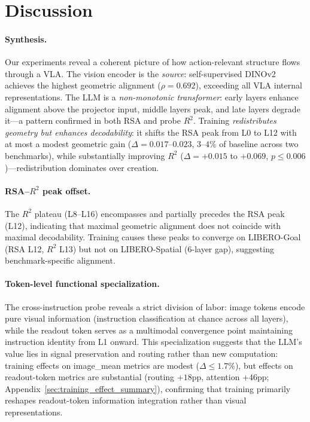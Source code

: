 \section{Discussion}
\label{sec:discussion}

\paragraph{Synthesis.}
Our experiments reveal a coherent picture of how action-relevant structure flows through a VLA.
The vision encoder is the \emph{source}: self-supervised DINOv2 achieves the highest geometric alignment ($\rho = 0.692$), exceeding all VLA internal representations.
The LLM is a \emph{non-monotonic transformer}: early layers enhance alignment above the projector input, middle layers peak, and late layers degrade it---a pattern confirmed in both RSA and probe $R^2$.
Training \emph{redistributes geometry but enhances decodability}: it shifts the RSA peak from L0 to L12 with at most a modest geometric gain ($\Delta = 0.017$--$0.023$, $3$--$4\%$ of baseline across two benchmarks), while substantially improving $R^2$ ($\Delta = +0.015$ to $+0.069$, $p \leq 0.006$)---redistribution dominates over creation.

\paragraph{RSA--$R^2$ peak offset.}
The $R^2$ plateau (L8--L16) encompasses and partially precedes the RSA peak (L12), indicating that maximal geometric alignment does not coincide with maximal decodability.
Training causes these peaks to converge on LIBERO-Goal (RSA L12, $R^2$ L13) but not on LIBERO-Spatial (6-layer gap), suggesting benchmark-specific alignment.

\paragraph{Token-level functional specialization.}
The cross-instruction probe reveals a strict division of labor: image tokens encode pure visual information (instruction classification at chance across all layers), while the readout token serves as a multimodal convergence point maintaining instruction identity from L1 onward.
This specialization suggests that the LLM's value lies in signal preservation and routing rather than new computation: training effects on image\_mean metrics are modest ($\Delta \leq 1.7\%$), but effects on readout-token metrics are substantial (routing $+18$pp, attention $+46$pp; Appendix~\ref{sec:training_effect_summary}), confirming that training primarily reshapes readout-token information integration rather than visual representations.

